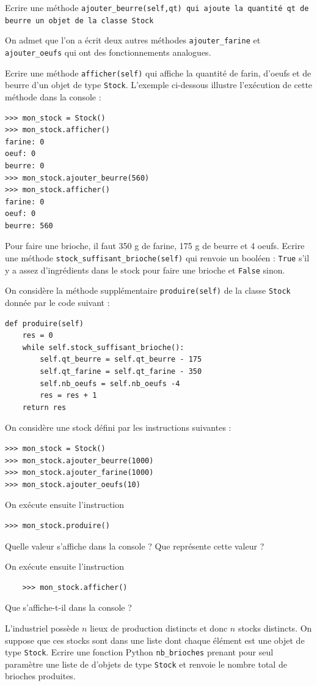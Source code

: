 \documentclass[11pt,a4paper]{article}
\begin{document}
\QListe
\item Ecrire une méthode {\tt ajouter\_beurre(self,qt) qui ajoute la quantité {\tt qt} de beurre  un objet de la classe {\tt Stock}} \\

\parindent -1cm 
\parbox{\textwidth}{On admet que l'on a écrit deux autres méthodes {\tt ajouter\_farine} et {\tt ajouter\_oeufs} qui ont des fonctionnements analogues.} \vspace{0.2cm}


\item Ecrire une méthode {\tt afficher(self)} qui affiche la quantité de farin, d'oeufs et de beurre d'un objet de type {\tt Stock}. L'exemple ci-dessous illustre l'exécution de cette méthode dans la console :
\begin{lstlisting}
>>> mon_stock = Stock()
>>> mon_stock.afficher()
farine: 0
oeuf: 0
beurre: 0
>>> mon_stock.ajouter_beurre(560)
>>> mon_stock.afficher()
farine: 0
oeuf: 0
beurre: 560
\end{lstlisting}

\item Pour faire une brioche, il faut 350 g de farine, 175 g de beurre et 4 oeufs. Ecrire une méthode {\tt stock\_suffisant\_brioche(self)} qui renvoie un booléen : {\tt True} s'il y a assez d'ingrédients dans le stock pour faire une brioche et {\tt False} sinon.
\item On considère la méthode supplémentaire {\tt produire(self)} de la classe {\tt Stock} donnée par le code suivant :
\begin{lstlisting}
def produire(self)
    res = 0
    while self.stock_suffisant_brioche():
        self.qt_beurre = self.qt_beurre - 175
        self.qt_farine = self.qt_farine - 350
        self.nb_oeufs = self.nb_oeufs -4
        res = res + 1
    return res
\end{lstlisting}

On considère une stock défini par les instructions suivantes :
\begin{lstlisting}
>>> mon_stock = Stock()
>>> mon_stock.ajouter_beurre(1000)
>>> mon_stock.ajouter_farine(1000)
>>> mon_stock.ajouter_oeufs(10)
\end{lstlisting}
\SQListe
\item On exécute ensuite l'instruction 
\begin{lstlisting}
>>> mon_stock.produire()
\end{lstlisting}
Quelle valeur s'affiche dans la console ? Que représente cette valeur ?
\item On exécute ensuite l'instruction
\begin{lstlisting}
    >>> mon_stock.afficher()
\end{lstlisting}
Que s'affiche-t-il dans la console ?
\FinListe
\item L'industriel possède $n$ lieux de production distincts et donc $n$ stocks distincts. On suppose que ces stocks sont dans une liste dont chaque élément est une objet de type {\tt Stock}. Ecrire une fonction Python {\tt nb\_brioches} prenant pour seul paramètre une liste de d'objets de type {\tt Stock} et renvoie le nombre total de brioches produites.
\FinListe
\end{document}
